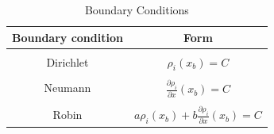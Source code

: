 \begin{table}[h]
    \caption{\label{tab:boundaryConditions} Boundary Conditions}
    \centering
    \begin{tabular}{c|c}
    \hline
    \textbf{Boundary condition} & \textbf{Form} \\ [0.5ex] 
    \hline
    \hline
    \\ [-0.75em]
    Dirichlet & $\rho_{i}(x_{b}) = C$\\ [0.8ex] \hline \\ [-0.75em]
    Neumann & $\frac{\partial \rho_{i}}{\partial x}(x_{b}) = C$\\ [0.8ex] \hline \\ [-0.75em]
    Robin & $a\rho_{i}(x_{b}) + b\frac{\partial \rho_{i}}{\partial x}(x_{b}) = C$\\ [0.8ex] \hline
    \end{tabular}
\end{table}



